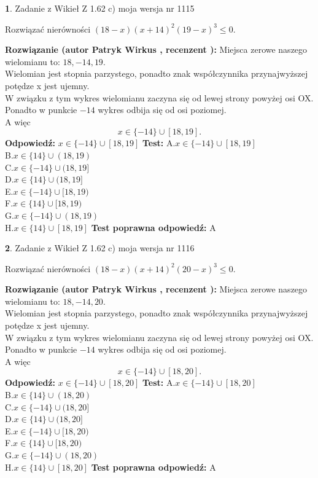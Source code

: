 \documentclass[12pt, a4paper]{article}
\theoremstyle{definition} %
\newtheorem{zad}{}
\newcommand{\zadStart}[1]{\begin{zad}#1\newline}
\newcommand{\zadStop}{\end{zad}}
\newcommand{\rozwStart}[2]{\noindent \textbf{Rozwiązanie (autor #1 , recenzent #2): }\newline}
\newcommand{\rozwStop}{\newline}
\newcommand{\odpStart}{\noindent \textbf{Odpowiedź:}\newline}
\newcommand{\odpStop}{\newline}
\newcommand{\testStart}{\noindent \textbf{Test:}\newline}
\newcommand{\testStop}{\newline}
\newcommand{\kluczStart}{\noindent \textbf{Test poprawna odpowiedź:}\newline}
\newcommand{\kluczStop}{\newline}
\begin{document}
\zadStart{Zadanie z Wikieł Z 1.62 c) moja wersja nr 1115}

Rozwiązać nierówności $(18-x)(x+14)^{2}(19-x)^{3}\le0$.
\zadStop
\rozwStart{Patryk Wirkus}{}
Miejsca zerowe naszego wielomianu to: $18, -14, 19$.\\
Wielomian jest stopnia parzystego, ponadto znak współczynnika przy\linebreak najwyższej potędze x jest ujemny.\\ W związku z tym wykres wielomianu zaczyna się od lewej strony powyżej osi OX.\\
Ponadto w punkcie $-14$ wykres odbija się od osi poziomej.\\
A więc $$x \in \{-14\} \cup [18,19].$$
\rozwStop
\odpStart
$x \in \{-14\} \cup [18,19]$
\odpStop
\testStart
A.$x \in \{-14\} \cup [18,19]$\\
B.$x \in \{14\} \cup (18,19)$\\
C.$x \in \{-14\} \cup (18,19]$\\
D.$x \in \{14\} \cup (18,19]$\\
E.$x \in \{-14\} \cup [18,19)$\\
F.$x \in \{14\} \cup [18,19)$\\
G.$x \in \{-14\} \cup (18,19)$\\
H.$x \in \{14\} \cup [18,19]$
\testStop
\kluczStart
A
\kluczStop



\zadStart{Zadanie z Wikieł Z 1.62 c) moja wersja nr 1116}

Rozwiązać nierówności $(18-x)(x+14)^{2}(20-x)^{3}\le0$.
\zadStop
\rozwStart{Patryk Wirkus}{}
Miejsca zerowe naszego wielomianu to: $18, -14, 20$.\\
Wielomian jest stopnia parzystego, ponadto znak współczynnika przy\linebreak najwyższej potędze x jest ujemny.\\ W związku z tym wykres wielomianu zaczyna się od lewej strony powyżej osi OX.\\
Ponadto w punkcie $-14$ wykres odbija się od osi poziomej.\\
A więc $$x \in \{-14\} \cup [18,20].$$
\rozwStop
\odpStart
$x \in \{-14\} \cup [18,20]$
\odpStop
\testStart
A.$x \in \{-14\} \cup [18,20]$\\
B.$x \in \{14\} \cup (18,20)$\\
C.$x \in \{-14\} \cup (18,20]$\\
D.$x \in \{14\} \cup (18,20]$\\
E.$x \in \{-14\} \cup [18,20)$\\
F.$x \in \{14\} \cup [18,20)$\\
G.$x \in \{-14\} \cup (18,20)$\\
H.$x \in \{14\} \cup [18,20]$
\testStop
\kluczStart
A
\kluczStop
\end{document}
